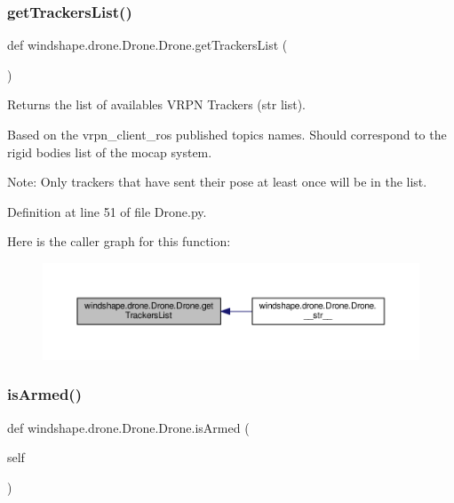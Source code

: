 \subsubsection{\texorpdfstring{get\+Trackers\+List()}{getTrackersList()}}
{\footnotesize\ttfamily def windshape.\+drone.\+Drone.\+Drone.\+get\+Trackers\+List (\begin{DoxyParamCaption}{ }\end{DoxyParamCaption})\hspace{0.3cm}{\ttfamily [static]}}

\begin{DoxyVerb}Returns the list of availables VRPN Trackers (str list).

Based on the vrpn_client_ros published topics names. Should
correspond to the rigid bodies list of the mocap system.

Note:
    Only trackers that have sent their pose at least once will
    be in the list.
\end{DoxyVerb}
 

Definition at line 51 of file Drone.\+py.

Here is the caller graph for this function\+:\nopagebreak
\begin{figure}[H]
\begin{center}
\leavevmode
\includegraphics[width=350pt]{classwindshape_1_1drone_1_1_drone_1_1_drone_a7e7eced60d10a8b1eb38b7ebf6a02f0f_icgraph}
\end{center}
\end{figure}
\mbox{\label{classwindshape_1_1drone_1_1_drone_1_1_drone_a161d7774319e5de5dd7f13f5c66b64a3}} 
\subsubsection{\texorpdfstring{is\+Armed()}{isArmed()}}
{\footnotesize\ttfamily def windshape.\+drone.\+Drone.\+Drone.\+is\+Armed (\begin{DoxyParamCaption}\item[{}]{self }\end{DoxyParamCaption})}

